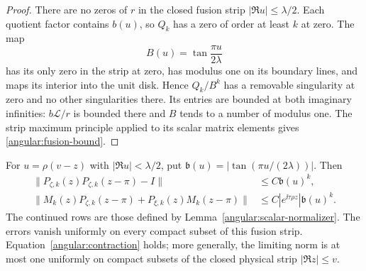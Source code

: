 \begin{proof}
There are no zeros of $r$ in the closed fusion strip
$|\Re u|\le\lambda/2$.  Each quotient factor contains $b(u)$,
so $Q_k$ has a zero of order at least $k$ at zero.  The map
\[
 B(u)=\tan\frac{\pi u}{2\lambda}
\]
has its only zero in the strip at zero, has modulus one on its
boundary lines, and maps its interior into the unit disk.  Hence
$Q_k/B^k$ has a removable singularity at zero and no other
singularities there.  Its entries are bounded at both imaginary
infinities: $b\mathcal L/r$ is bounded there and $B$ tends to a
number of modulus one.  The strip maximum principle applied to
its scalar matrix elements gives \eqref{angular:fusion-bound}.
\end{proof}

\begin{lemma}\label{angular:two-row}
For $u=\rho(v-z)$ with $|\Re u|<\lambda/2$, put
$\mathfrak b(u)=|\tan(\pi u/(2\lambda))|$.  Then
\begin{align}
 \|P_{\zeta,k}(z)P_{\zeta,k}(z-\pi)-I\|
 &\le C\mathfrak b(u)^k,\label{angular:inversion}\\
 \|M_k(z)P_{\zeta,k}(z-\pi)
       +P_{\xi,k}(z)M_k(z-\pi)\|
 &\le C|e^{\ii\tau\rho z}|\mathfrak b(u)^k.
       \label{angular:marker-inversion}
\end{align}
The continued rows are those defined by Lemma~\ref{angular:scalar-normalizer}.
The errors vanish uniformly on every compact subset of this fusion
strip.  Equation~\eqref{angular:contraction} holds; more generally,
the limiting norm is at most one uniformly on compact subsets of
the closed physical strip $|\Re z|\le v$.
\end{lemma}

